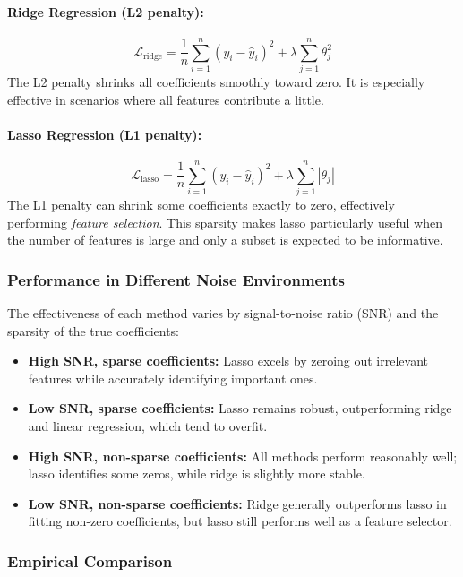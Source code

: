 \documentclass[9pt]{extarticle}
\begin{document}
\paragraph{Ridge Regression (L2 penalty):}
\[
\mathcal{L}_{\text{ridge}} = \frac{1}{n} \sum_{i=1}^n (y_i - \hat{y}_i)^2 + \lambda \sum_{j=1}^n \theta_j^2
\]
The L2 penalty shrinks all coefficients smoothly toward zero. It is especially effective in scenarios where all features contribute a little.

\paragraph{Lasso Regression (L1 penalty):}
\[
\mathcal{L}_{\text{lasso}} = \frac{1}{n} \sum_{i=1}^n (y_i - \hat{y}_i)^2 + \lambda \sum_{j=1}^n |\theta_j|
\]
The L1 penalty can shrink some coefficients exactly to zero, effectively performing \emph{feature selection}. This sparsity makes lasso particularly useful when the number of features is large and only a subset is expected to be informative.

\subsubsection*{Performance in Different Noise Environments}

The effectiveness of each method varies by signal-to-noise ratio (SNR) and the sparsity of the true coefficients:

\begin{itemize}
    \item \textbf{High SNR, sparse coefficients:} Lasso excels by zeroing out irrelevant features while accurately identifying important ones.
    \item \textbf{Low SNR, sparse coefficients:} Lasso remains robust, outperforming ridge and linear regression, which tend to overfit.
    \item \textbf{High SNR, non-sparse coefficients:} All methods perform reasonably well; lasso identifies some zeros, while ridge is slightly more stable.
    \item \textbf{Low SNR, non-sparse coefficients:} Ridge generally outperforms lasso in fitting non-zero coefficients, but lasso still performs well as a feature selector.
\end{itemize}

\subsubsection*{Empirical Comparison}
\end{document}

